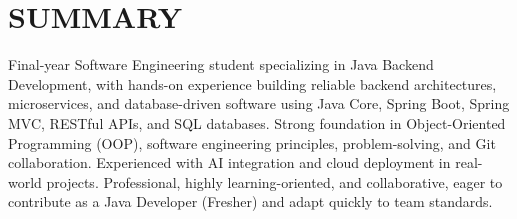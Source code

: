 \section{SUMMARY}
\noindent Final-year Software Engineering student specializing in Java Backend Development, with hands-on experience building reliable backend architectures, microservices, and database-driven software using Java Core, Spring Boot, Spring MVC, RESTful APIs, and SQL databases. Strong foundation in Object-Oriented Programming (OOP), software engineering principles, problem-solving, and Git collaboration. Experienced with AI integration and cloud deployment in real-world projects. Professional, highly learning-oriented, and collaborative, eager to contribute as a Java Developer (Fresher) and adapt quickly to team standards.
